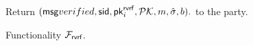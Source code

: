 \begin{figure}
\begin{tcolorbox}
{\begin{description}
				Return $(\mathsf{msg}{verified}, \textsf{sid}, \mathsf{pk}^{\mathsf{rvrf}}_i, {\mathcal{PK}}, m, \hat\sigma, b).$ to the party.
			\end{description}
		}
	\end{tcolorbox}
	\caption{Functionality $\mathcal{F}_{\textsf{rvrf}}$.\label{f:gvrf}}
\end{figure}



